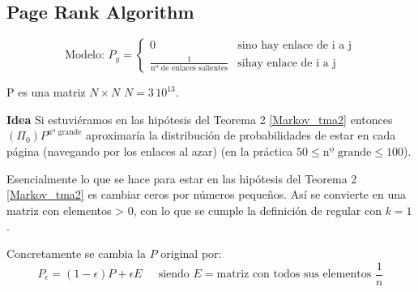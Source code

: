 \subsection{Page Rank Algorithm}

\begin{center}
\end{center}


$$\text{Modelo: } P_y = \left\{
	\begin{array}{ll}
		0  & \mbox{si} \text{no hay enlace de i a j} \\
		\frac{1}{\text{nº de enlaces salientes}} & \mbox{si} \text{hay enlace de i a j}
	\end{array}
\right.
$$

P es una matriz $N \times N$ $N = 3 \, 10^{13}$.

\textbf{Idea} Si estuviéramos en las hipótesis del Teorema 2 \ref{Markov_tma2} entonces  $(\Pi_0) P^{\text{nº grande}}$ aproximaría la distribución de probabilidades de estar en cada página (navegando por los enlaces al azar) (en la práctica $50 \leq \text{nº grande} \leq 100$).


Esencialmente lo que se hace para estar en las hipótesis del Teorema 2 \ref{Markov_tma2} es cambiar ceros por números pequeños. Así se convierte en una matriz con elementos > 0, con lo que se cumple la definición de regular con $k=1$.

Concretamente se cambia la $P$ original por:
$$P_{\epsilon} = (1-\epsilon) P + \epsilon E \;\;\;\; \text{ siendo }E = \text{matriz con todos sus elementos } \frac{1}{n}$$

